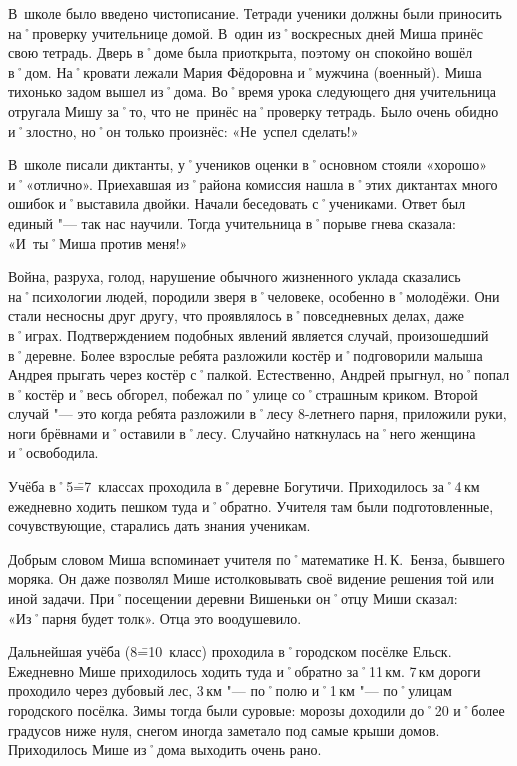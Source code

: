 В~школе было введено чистописание. Тетради ученики должны были приносить на˚проверку учительнице домой. В~один из˚воскресных дней Миша принёс свою тетрадь. Дверь в˚доме была приоткрыта, поэтому он спокойно вошёл в˚дом. На˚кровати лежали Мария Фёдоровна и˚мужчина (военный). Миша тихонько задом вышел из˚дома. Во˚время урока следующего дня учительница отругала Мишу за˚то, что не~принёс на˚проверку тетрадь. Было очень обидно и˚злостно, но˚он только произнёс: «Не~успел сделать!»

В~школе писали диктанты, у˚учеников оценки в˚основном стояли «хорошо» и˚«отлично». Приехавшая из˚района комиссия нашла в˚этих диктантах много ошибок и˚выставила двойки. Начали беседовать с˚учениками. Ответ был единый "--- так нас научили. Тогда учительница в˚порыве гнева сказала: «И~ты˚Миша против меня!»

Война, разруха, голод, нарушение обычного жизненного уклада сказались на˚психологии людей, породили зверя в˚человеке, особенно в˚молодёжи. Они стали несносны друг другу, что проявлялось в˚повседневных делах, даже в˚играх. Подтверждением подобных явлений является случай, произошедший в˚деревне. Более взрослые ребята разложили костёр и˚подговорили малыша Андрея  прыгать через костёр с˚палкой. Естественно, Андрей прыгнул, но˚попал в˚костёр и˚весь обгорел, побежал по˚улице со˚страшным криком. Второй случай "--- это когда ребята разложили в˚лесу 8-летнего парня, приложили руки, ноги брёвнами и˚оставили в˚лесу. Случайно наткнулась на˚него женщина и˚освободила.

Учёба в˚5\==7~классах проходила в˚деревне Богутичи. Приходилось за˚4\,км ежедневно ходить пешком туда и˚обратно. Учителя там были подготовленные, сочувствующие, старались дать знания ученикам. 

Добрым словом Миша вспоминает учителя по˚математике Н.\,К.~Бенза, бывшего моряка. Он даже позволял Мише истолковывать своё видение решения той или иной задачи. При˚посещении деревни Вишеньки он˚отцу Миши сказал: «Из˚парня будет толк». Отца это воодушевило.

Дальнейшая учёба (8\==10~класс) проходила в˚городском посёлке Ельск. Ежедневно Мише приходилось ходить туда и˚обратно за˚11\,км. 7\,км дороги проходило через дубовый лес, 3\,км "--- по˚полю и˚1\,км "--- по˚улицам городского посёлка. Зимы тогда были суровые: морозы доходили до˚20 и˚более градусов ниже нуля, снегом иногда заметало под самые крыши домов. Приходилось Мише из˚дома выходить очень рано. 

